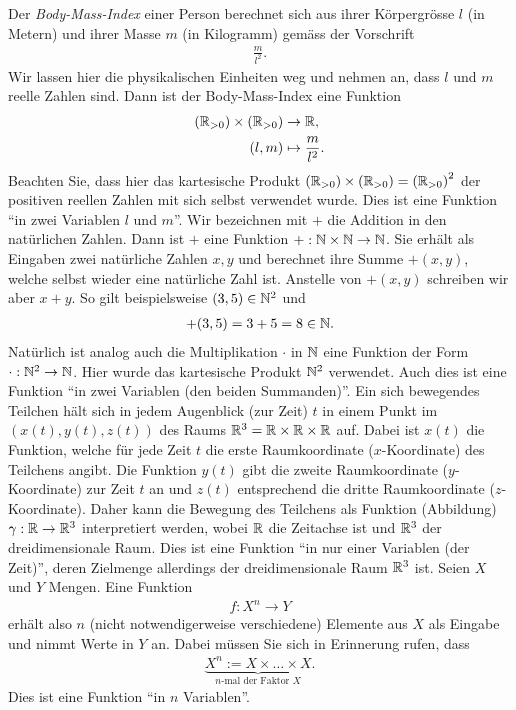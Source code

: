 \beispiele{-}{}
{Der \textit{Body-Mass-Index} einer Person berechnet sich aus ihrer Körpergrösse $l$ (in Metern) und ihrer Masse $m$ (in Kilogramm) gemäss der Vorschrift
\begin{align*}
    \frac{m}{l^2}.
\end{align*}
Wir lassen hier die physikalischen Einheiten weg und nehmen an, dass $l$ und $m$ reelle Zahlen sind. Dann ist der Body-Mass-Index eine Funktion
\begin{align*}
    \left(\mathbb{R}_{>0}\right)\times \left(\mathbb{R}_{>0}\right) &\to\mathbb{R},\\
    (l,m)&\mapsto \frac{m}{l^2}.
\end{align*}
Beachten Sie, dass hier das kartesische Produkt $\left(\mathbb{R}_{>0}\right)\times \left(\mathbb{R}_{>0}\right) = \left(\mathbb{R}_{>0}\right)^2$ der positiven reellen Zahlen mit sich selbst verwendet wurde. Dies ist eine Funktion \enquote{in zwei Variablen $l$ und $m$}.
}
{Wir bezeichnen mit $+$ die Addition in den natürlichen Zahlen. Dann ist $+$ eine Funktion $+: \mathbb{N}\times \mathbb{N} \to\mathbb{N}$. Sie erhält als Eingaben zwei natürliche Zahlen $x,y$ und berechnet ihre Summe $+(x,y)$, welche selbst wieder eine natürliche Zahl ist. Anstelle von $+(x,y)$ schreiben wir aber $x + y$. So gilt beispielsweise $(3,5)\in\mathbb{N}^2$ und
\begin{align*}
    +(3,5) = 3 + 5 = 8 \in\mathbb{N}.
\end{align*}
Natürlich ist analog auch die Multiplikation $\cdot$ in $\mathbb{N}$ eine Funktion der Form $\cdot: \mathbb{N}^2\to\mathbb{N}$. Hier wurde das kartesische Produkt $\mathbb{N}^2$ verwendet. Auch dies ist eine Funktion \enquote{in zwei Variablen (den beiden Summanden)}.
}
{
Ein sich bewegendes Teilchen hält sich in jedem Augenblick (zur Zeit) $t$ in einem Punkt im $(x(t),y(t),z(t))$ des Raums $\mathbb{R}^3 = \mathbb{R}\times \mathbb{R}\times \mathbb{R}$ auf. Dabei ist $x(t)$ die Funktion, welche für jede Zeit $t$ die erste Raumkoordinate ($x$-Koordinate) des Teilchens angibt. Die Funktion $y(t)$ gibt die zweite Raumkoordinate ($y$-Koordinate) zur Zeit $t$ an und $z(t)$ entsprechend die dritte Raumkoordinate ($z$-Koordinate). Daher kann die Bewegung des Teilchens als Funktion (Abbildung) $\gamma: \mathbb{R}\to\mathbb{R}^3$ interpretiert werden, wobei $\mathbb{R}$ die Zeitachse ist und $\mathbb{R}^3$ der dreidimensionale Raum. Dies ist eine Funktion \enquote{in nur einer Variablen (der Zeit)}, deren Zielmenge allerdings der dreidimensionale Raum $\mathbb{R}^3$ ist.
}
{Seien $X$ und $Y$ Mengen. Eine Funktion
\begin{align*}
    f: X^n\to Y
\end{align*}
erhält also $n$ (nicht notwendigerweise verschiedene) Elemente aus $X$ als Eingabe und nimmt Werte in $Y$ an. Dabei müssen Sie sich in Erinnerung rufen, dass
\begin{align*}
    \underbrace{X^n := X\times \ldots \times X}_{n\text{-mal der Faktor }X}.
\end{align*}
Dies ist eine Funktion \enquote{in $n$ Variablen}.}

